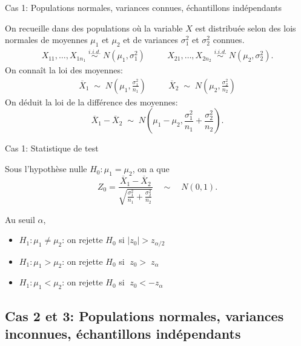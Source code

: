 \documentclass{BeamerTemplate}
\begin{document}
\begin{frame}[t]{Cas 1: Populations normales, variances connues, échantillons indépendants}

On recueille  dans des populations où la variable $X$ est  distribuée selon des lois normales de moyennes $\mu_1$ et $\mu_2$ et de variances $\sigma^2_1$ et $\sigma^2_2$ {connues}.
\begin{align*}
X_{11}, \ldots, X_{1n_1}\; \overset{i.i.d.}{\sim} \;N(\mu_1, \sigma^2_1) & \quad &  X_{21}, \ldots, X_{2n_2} \;\overset{i.i.d.}{\sim}\; N(\mu_2, \sigma^2_2).
\end{align*}
On connaît la loi des moyennes:
\begin{align*}
\overline{X}_1 %
\;\sim \;N\left(\mu_1, \frac{\sigma_1^2}{n_1} \right) &\quad &
\overline{X}_2 %
\;\sim\; N\left(\mu_2, \frac{\sigma_2^2}{n_2}\right)
\end{align*}
On déduit la loi de la différence des moyennes:
$$\overline{X}_1 - \overline{X}_2 \;\sim\; N\left( \mu_1 - \mu_2, \frac{\sigma^2_1}{n_1} + \frac{\sigma^2_2}{n_2} \right). $$
\end{frame}

\begin{frame}[t]{Cas 1: Statistique de test}

{\small
Sous l'hypothèse nulle $H_0 : \mu_1 = \mu_2$, on a que
$$
Z_0 = \frac{\overline{X}_1 - \overline{X}_2 }{\sqrt{\frac{\sigma^2_1}{n_1} + \frac{\sigma^2_2}{n_2} }} \quad \sim \quad N(0,1).
$$

Au seuil $\alpha$,

\begin{itemize}\itemsep4mm
\item $H_1 : \mu_1 \ne \mu_2$: on rejette $H_0$ si $|z_0| > z_{\alpha/2}$
\item $H_1 : \mu_1 > \mu_2$: on rejette $H_0$ si $\;z_0 > \;z_{\alpha}$
\item $H_1 : \mu_1 < \mu_2$: on rejette $H_0$ si $\;z_0 < -z_{\alpha}$
\end{itemize}
}
\end{frame}


\subsection{Cas 2 et 3: Populations normales, variances inconnues, échantillons indépendants}\label{sec:ttestindep}
\end{document}
